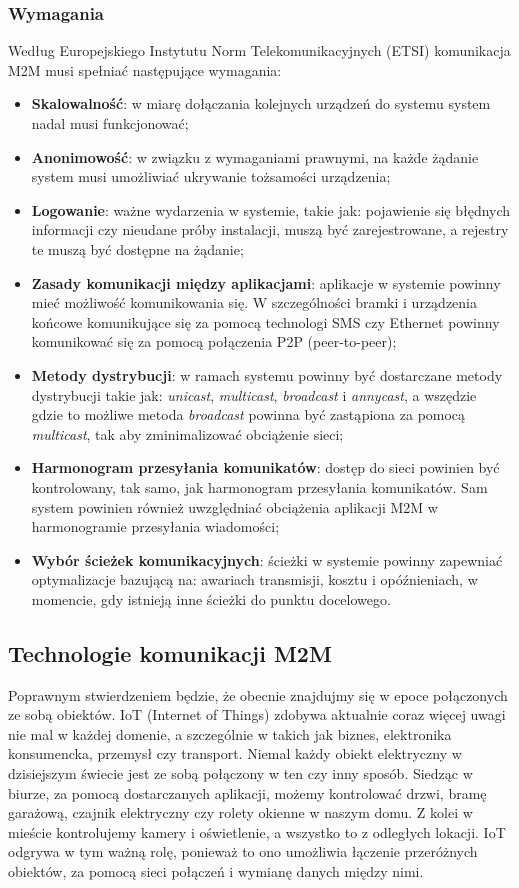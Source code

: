 \subsubsection{Wymagania}
Według Europejskiego Instytutu Norm Telekomunikacyjnych (ETSI) komunikacja \\M2M musi spełniać następujące wymagania:
\begin{itemize}
  \item \textbf{Skalowalność}: w miarę dołączania kolejnych urządzeń do systemu system nadal musi funkcjonować;
  \item \textbf{Anonimowość}: w związku z wymaganiami prawnymi, na każde żądanie system musi umożliwiać ukrywanie tożsamości urządzenia;
  \item \textbf{Logowanie}: ważne wydarzenia w systemie, takie jak: pojawienie się błędnych informacji czy nieudane próby instalacji, muszą być zarejestrowane, a rejestry te muszą być dostępne na żądanie;
  \item \textbf{Zasady komunikacji między aplikacjami}: aplikacje w systemie powinny mieć możliwość komunikowania się. W szczególności bramki i urządzenia końcowe komunikujące się za pomocą technologi SMS czy Ethernet powinny komunikować się za pomocą połączenia P2P (peer-to-peer);
  \item \textbf{Metody dystrybucji}: w ramach systemu powinny być dostarczane metody dystrybucji takie jak: \emph{unicast}, \emph{multicast}, \emph{broadcast} i \emph{annycast}, a wszędzie gdzie to możliwe metoda \emph{broadcast} powinna być zastąpiona za pomocą \emph{multicast}, tak aby zminimalizować obciążenie sieci;
  \item \textbf{Harmonogram przesyłania komunikatów}: dostęp do sieci powinien być kontrolowany, tak samo, jak harmonogram przesyłania komunikatów. Sam system powinien również uwzględniać obciążenia aplikacji M2M w harmonogramie przesyłania wiadomości;
  \item \textbf{Wybór ścieżek komunikacyjnych}: ścieżki w systemie powinny zapewniać optymalizacje bazującą na: awariach transmisji, kosztu i opóźnieniach, w momencie, gdy istnieją inne ścieżki do punktu docelowego. \cite{m2m-web}
\end{itemize}

\subsection{Technologie komunikacji M2M}
Poprawnym stwierdzeniem będzie, że obecnie znajdujmy się w epoce połączonych ze sobą obiektów. IoT (Internet of Things) zdobywa aktualnie coraz więcej uwagi nie mal w każdej domenie, a szczególnie w takich jak biznes, elektronika konsumencka, przemysł czy transport. Niemal każdy obiekt elektryczny w dzisiejszym świecie jest ze sobą połączony w ten czy inny sposób. Siedząc w biurze, za pomocą dostarczanych aplikacji, możemy kontrolować drzwi, bramę garażową, czajnik elektryczny czy rolety okienne w naszym domu. Z kolei w mieście kontrolujemy kamery i oświetlenie, a wszystko to z odległych lokacji. IoT odgrywa w tym ważną rolę, ponieważ to ono umożliwia łączenie przeróżnych obiektów, za pomocą sieci połączeń i wymianę danych między nimi.\cite{LoRa-article}


